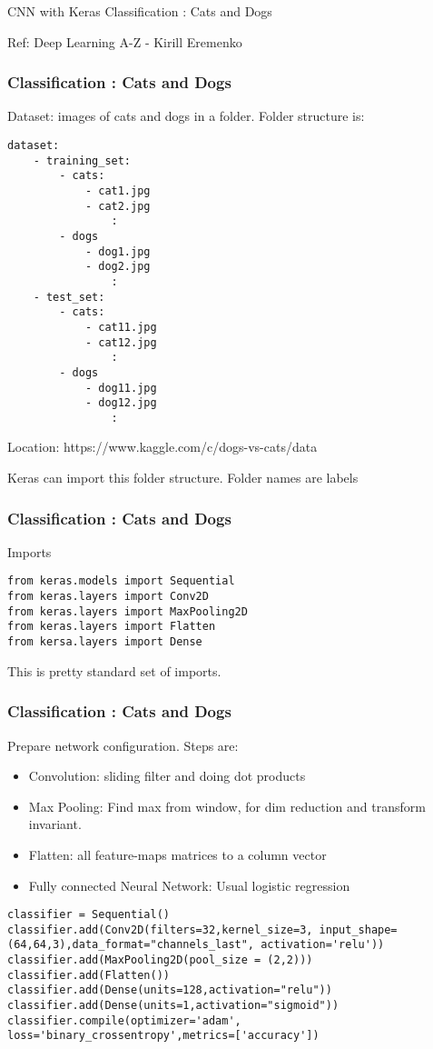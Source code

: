 \begin{frame}
  \begin{center}
    {\Large CNN with Keras Classification : Cats and Dogs}
    
    {Ref: Deep Learning A-Z - Kirill Eremenko}
  \end{center}
\end{frame}

\begin{frame}[fragile] \frametitle{Classification : Cats and Dogs}
Dataset: images of cats and dogs in a folder. Folder structure is:
\begin{lstlisting}
dataset:
	- training_set:
		- cats:
			- cat1.jpg
			- cat2.jpg		
				:	
		- dogs
			- dog1.jpg
			- dog2.jpg		
				:	
	- test_set:
		- cats:
			- cat11.jpg
			- cat12.jpg		
				:	
		- dogs
			- dog11.jpg
			- dog12.jpg		
				:					
\end{lstlisting}

Location: https://www.kaggle.com/c/dogs-vs-cats/data

Keras can import this folder structure. Folder names are labels
\end{frame}

\begin{frame}[fragile] \frametitle{Classification : Cats and Dogs}
Imports
\begin{lstlisting}
from keras.models import Sequential
from keras.layers import Conv2D
from keras.layers import MaxPooling2D
from keras.layers import Flatten
from kersa.layers import Dense
\end{lstlisting}

This is pretty standard set of imports.
\end{frame}

\begin{frame}[fragile] \frametitle{Classification : Cats and Dogs}
Prepare network configuration. Steps are:
\begin{itemize}
\item Convolution: sliding filter and doing dot products
\item Max Pooling: Find max from window, for dim reduction and transform invariant.
\item Flatten: all feature-maps matrices to a column vector
\item Fully connected Neural Network: Usual logistic regression
\end{itemize}
\begin{lstlisting}
classifier = Sequential()
classifier.add(Conv2D(filters=32,kernel_size=3, input_shape=(64,64,3),data_format="channels_last", activation='relu'))
classifier.add(MaxPooling2D(pool_size = (2,2)))
classifier.add(Flatten())
classifier.add(Dense(units=128,activation="relu"))
classifier.add(Dense(units=1,activation="sigmoid"))
classifier.compile(optimizer='adam', loss='binary_crossentropy',metrics=['accuracy'])
\end{lstlisting}

\end{frame}

